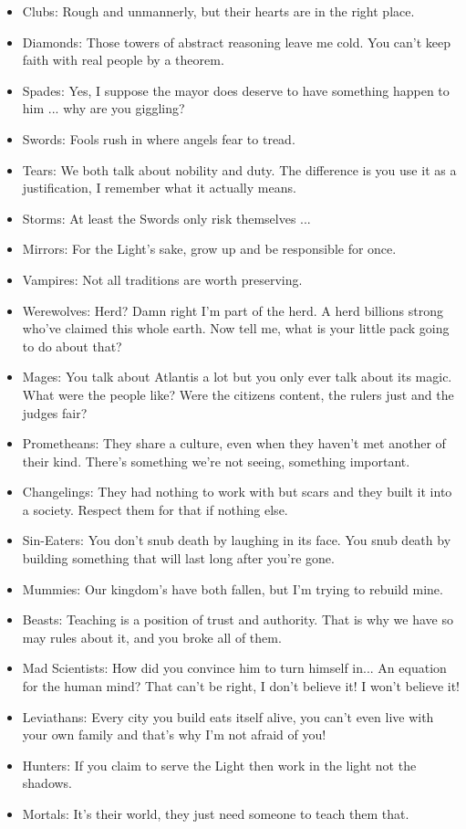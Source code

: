 \begin{itemize}
\item Clubs: Rough and unmannerly, but their hearts are in the right place.
\item Diamonds: Those towers of abstract reasoning leave me cold. You can't keep faith with real people by a theorem.
\item Spades: Yes, I suppose the mayor does deserve to have something happen to him ... why are you giggling?
\item Swords: Fools rush in where angels fear to tread.
\item Tears: We both talk about nobility and duty. The difference is you use it as a justification, I remember what it actually means. 
\item Storms: At least the Swords only risk themselves ...
\item Mirrors: For the Light's sake, grow up and be responsible for once.

\item Vampires: Not all traditions are worth preserving.
\item Werewolves: Herd? Damn right I'm part of the herd. A herd billions strong who've claimed this whole earth. Now tell me, what is your little pack going to do about that?
\item Mages: You talk about Atlantis a lot but you only ever talk about its magic. What were the people like? Were the citizens content, the rulers just and the judges fair?
\item Prometheans: They share a culture, even when they haven't met another of their kind. There's something we're not seeing, something important.
\item Changelings: They had nothing to work with but scars and they built it into a society. Respect them for that if nothing else.
\item Sin-Eaters: You don't snub death by laughing in its face. You snub death by building something that will last long after you're gone.
\item Mummies: Our kingdom's have both fallen, but I'm trying to rebuild mine. 
\item Beasts: Teaching is a position of trust and authority. That is why we have so may rules about it, and you broke all of them.
\item Mad Scientists: How did you convince him to turn himself in... An equation for the human mind? That can't be right, I don't believe it! I won't believe it!
\item Leviathans: Every city you build eats itself alive, you can't even live with your own family and that's why I'm not afraid of you!
\item Hunters: If you claim to serve the Light then work in the light not the shadows.
\item Mortals: It's their world, they just need someone to teach them that.
\end{itemize}

